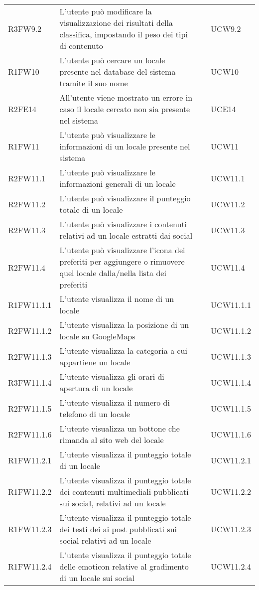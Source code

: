 \begin{longtable}{ m{}<{\centering}  m{}<{\centering}  m{}<{\centering}  m{}<{\centering}}
	R3FW9.2 & L’utente può modificare la visualizzazione dei risultati della classifica, impostando il peso dei tipi di contenuto & \Fa & UCW9.2\\	  
	 
	R1FW10 & L’utente può cercare un locale presente nel database del sistema tramite il suo nome & \Ob & UCW10 \\	 
	 
	R2FE14 & All’utente viene mostrato un errore in caso il locale cercato non sia presente nel sistema & \De & UCE14\\	 
	 	 
	R1FW11 & L’utente può visualizzare le informazioni di un locale presente nel sistema & \Ob & UCW11\\	

	R2FW11.1 & L’utente può visualizzare le informazioni generali di un locale & \De & UCW11.1 \\
	R2FW11.2 & L’utente può visualizzare il punteggio totale di un locale & \De & UCW11.2 \\
	R2FW11.3 & L’utente può visualizzare i contenuti relativi ad un locale estratti dai social & \De & UCW11.3 \\
	R2FW11.4 & L’utente può visualizzare l’icona dei preferiti per aggiungere o rimuovere quel locale dalla/nella lista dei preferiti & \De & UCW11.4 \\

	R1FW11.1.1 & L’utente visualizza il nome di un locale & \Ob & UCW11.1.1 \\
	R2FW11.1.2 & L’utente visualizza la posizione di un locale su GoogleMaps & \De & UCW11.1.2 \\
	R2FW11.1.3 & L’utente visualizza la categoria a cui appartiene un locale & \De & UCW11.1.3 \\
	R3FW11.1.4 & L’utente visualizza gli orari di apertura di un locale & \Fa & UCW11.1.4 \\
	R2FW11.1.5 & L’utente visualizza il numero di telefono di un locale & \De & UCW11.1.5 \\
	R2FW11.1.6 & L’utente visualizza un bottone che rimanda al sito web del locale & \De & UCW11.1.6 \\

	R1FW11.2.1 & L’utente visualizza il punteggio totale di un locale & \Ob & UCW11.2.1 \\
	R1FW11.2.2 & L’utente visualizza il punteggio totale dei contenuti multimediali pubblicati sui social, relativi ad un locale & \Ob & UCW11.2.2 \\
	R1FW11.2.3 & L’utente visualizza il punteggio totale dei testi dei ai post pubblicati sui social relativi ad un locale & \Ob & UCW11.2.3 \\
	R1FW11.2.4 & L’utente visualizza il punteggio totale delle emoticon relative al gradimento di un locale sui social & \Ob & UCW11.2.4 \\


\end{longtable}
